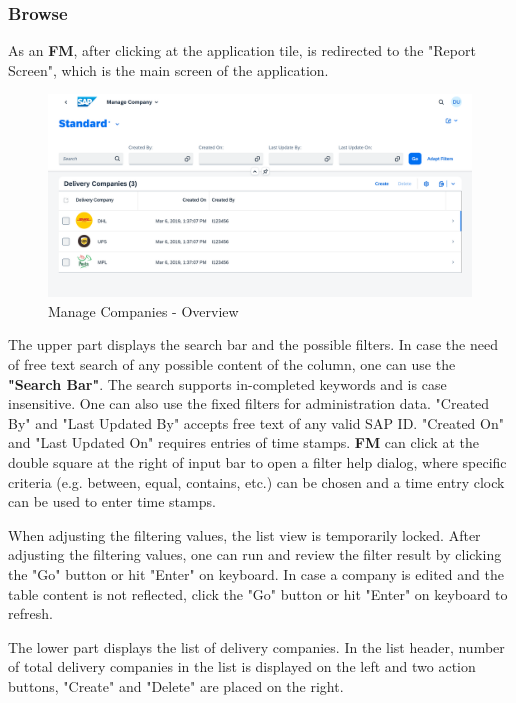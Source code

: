 \subsubsection{Browse}
As an \textbf{FM}, after clicking at the application tile, is redirected to the "Report Screen", which is the main screen of the application. 

\begin{figure}[H]
	\centering
	\includegraphics[width=1\linewidth]{images/user_doc/company/report/overview.png}
	\caption{Manage Companies - Overview}
	\label{fig:CompanyOverview}
\end{figure}

The upper part displays the search bar and the possible filters. 
In case the need of free text search of any possible content of the column, one can use the \textbf{"Search Bar"}. The search supports in-completed keywords and is case insensitive. One can also use the fixed filters for administration data. "Created By" and "Last Updated By" accepts free text of any valid SAP ID. "Created On" and "Last Updated On" requires entries of time stamps. \textbf{FM} can click at the double square at the right of input bar to open a filter help dialog, where specific criteria (e.g. between, equal, contains, etc.) can be chosen and a time entry clock can be used to enter time stamps.

When adjusting the filtering values, the list view is temporarily locked. After adjusting the filtering values, one can run and review the filter result by clicking the "Go" button or hit "Enter" on keyboard. In case a company is edited and the table content is not reflected, click the "Go" button or hit "Enter" on keyboard to refresh.

The lower part displays the list of delivery companies. In the list header, number of total delivery companies in the list is displayed on the left and two action buttons, "Create" and "Delete" are placed on the right. 

